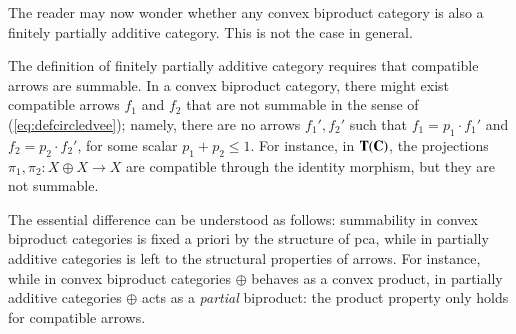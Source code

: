 \begin{remark}%
The reader may now wonder whether any convex biproduct category is also a finitely partially additive category. This is not the case in general. 

The definition of finitely partially additive category requires that compatible arrows are summable. In a convex biproduct category, there might exist compatible arrows $f_1$ and $f_2$ that are not summable in the sense of (\ref{eq:defcircledvee});  namely, there are no arrows $f_1',f_2'$ such that $f_1=p_1\cdot f_1'$ and $f_2=p_2\cdot f_2'$, for some scalar $p_1+p_2 \leq 1$. For instance, in $\mathbf{T}(\mathbf{C})$, the projections $\pi_1,\pi_2\colon X\oplus X\to X$ are compatible through the identity morphism, but they are not summable.

The essential difference can be understood as follows: summability in convex biproduct categories is fixed a priori by the structure of pca, while in partially additive categories is left to the structural properties of arrows. For instance, while in convex biproduct categories $\oplus$ behaves as a convex product, in partially additive categories $\oplus$ acts as a \emph{partial} biproduct: the product property only holds for compatible arrows.   

\end{remark}
